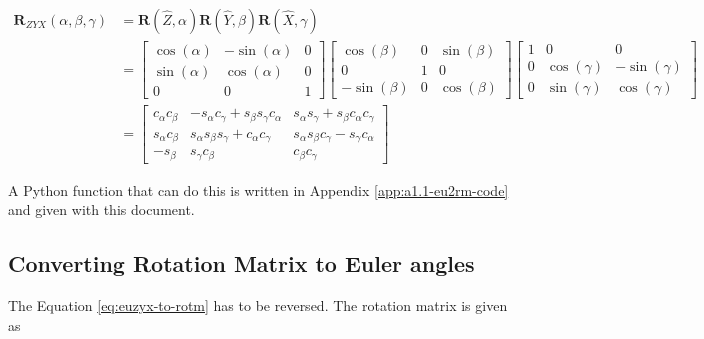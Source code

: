 \begin{equation}
    \begin{split}
        \mathbf{R}_{ZYX} \left ( \alpha, \beta, \gamma \right ) & = \mathbf{R}(\hat{Z}, \alpha) \mathbf{R}(\hat{Y}, \beta) \mathbf{R}(\hat{X}, \gamma) \\
        & = \begin{bmatrix}
            \cos(\alpha) & -\sin(\alpha) & 0 \\
            \sin(\alpha) & \cos(\alpha) & 0 \\
            0 & 0 & 1
            \end{bmatrix}
            \begin{bmatrix}
            \cos(\beta) & 0 & \sin(\beta) \\
            0 & 1 & 0 \\
            -\sin(\beta) & 0 & \cos(\beta)
            \end{bmatrix}
            \begin{bmatrix}
            1 & 0 & 0 \\
            0 & \cos(\gamma) & -\sin(\gamma) \\
            0 & \sin(\gamma) & \cos(\gamma)
            \end{bmatrix} \\
        & = \begin{bmatrix}
            c_\alpha c_\beta & -s_\alpha c_\gamma + s_\beta s_\gamma c_\alpha & s_\alpha s_\gamma + s_\beta c_\alpha c_\gamma \\
            s_\alpha c_\beta & s_\alpha s_\beta s_\gamma + c_\alpha c_\gamma & s_\alpha s_\beta c_\gamma - s_\gamma c_\alpha \\
            -s_\beta & s_\gamma c_\beta & c_\beta c_\gamma
            \end{bmatrix}
    \end{split}
    \label{eq:euzyx-to-rotm}
\end{equation}

A Python function that can do this is written in Appendix \ref{app:a1.1-eu2rm-code} and given with this document.

\subsection[A1.2: SO(3) to Euler]{Converting Rotation Matrix to Euler angles}

The Equation \ref{eq:euzyx-to-rotm} has to be reversed. The rotation matrix is given as

